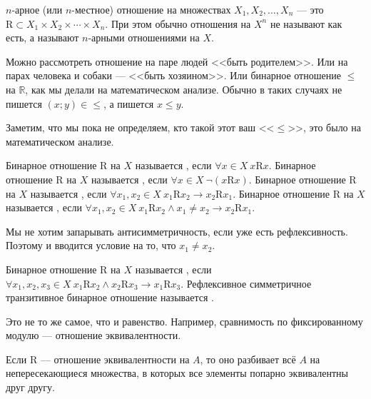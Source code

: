 \documentclass{article}
\begin{document}
    \begin{itemize}
        \dfn $n$-арное (или $n$-местное) отношение на множествах $X_1,X_2,\ldots,X_n$ --- это $\mathrm R\subset X_1\times X_2\times\cdots\times X_n$. При этом обычно отношения на $X^n$ не называют как есть, а называют $n$-арными отношениями на $X$.
        \begin{Example}
            Можно рассмотреть отношение на паре людей <<быть родителем>>. Или на парах человека и собаки --- <<быть хозяином>>. Или бинарное отношение $\leqslant$ на $\mathbb R$, как мы делали на математическом анализе. Обычно в таких случаях не пишется $(x;y)\in{\leqslant}$, а пишется $x\leqslant y$.
        \end{Example}
        \begin{Comment}
            Заметим, что мы пока не определяем, кто такой этот ваш <<$\leqslant$>>, это было на математическом анализе.
        \end{Comment}
        \dfn Бинарное отношение $\mathrm R$ на $X$ называется , если $\forall x\in X~x\mathrm Rx$.
        \dfn Бинарное отношение $\mathrm R$ на $X$ называется , если $\forall x\in X~\neg(x\mathrm Rx)$.
        \dfn Бинарное отношение $\mathrm R$ на $X$ называется , если $\forall x_1,x_2\in X~x_1\mathrm Rx_2\rightarrow x_2\mathrm Rx_1$.
        \dfn Бинарное отношение $\mathrm R$ на $X$ называется , если $\forall x_1,x_2\in X~x_1\mathrm Rx_2\land x_1\neq x_2\rightarrow x_2\mathrm Rx_1$.
        \begin{Comment}
            Мы не хотим запарывать антисимметричность, если уже есть рефлексивность. Поэтому и вводится условие на то, что $x_1\neq x_2$.
        \end{Comment}
        \dfn Бинарное отношение $\mathrm R$ на $X$ называется , если $\forall x_1,x_2,x_3\in X~x_1\mathrm Rx_2\land x_2\mathrm Rx_3\rightarrow x_1\mathrm Rx_3$.
        \dfn Рефлексивное симметричное транзитивное бинарное отношение называется .
        \begin{Example}
            Это не то же самое, что и равенство. Например, сравнимость по фиксированному модулю --- отношение эквивалентности.
        \end{Example}
        \thm Если $\mathrm R$ --- отношение эквивалентности на $A$, то оно разбивает всё $A$ на непересекающиеся множества, в которых все элементы попарно эквивалентны друг другу.

\end{itemize}
\end{document}
